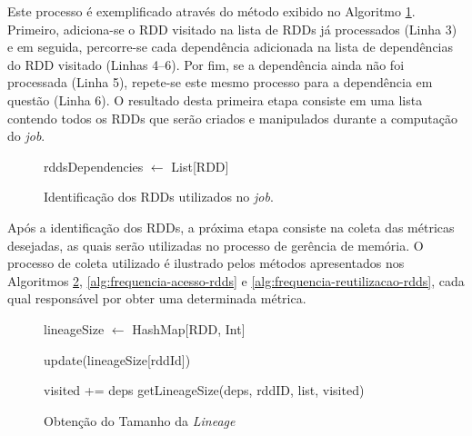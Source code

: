 Este processo é exemplificado através do método exibido no Algoritmo \ref{alg:lista-rdds}. Primeiro, adiciona-se o RDD visitado na lista de RDDs já processados (Linha 3) e em seguida, percorre-se cada dependência adicionada na lista de dependências do RDD visitado (Linhas 4--6). Por fim, se a dependência ainda não foi processada (Linha 5), repete-se este mesmo processo para a dependência em questão (Linha 6). O resultado desta primeira etapa consiste em uma lista contendo todos os RDDs que serão criados e manipulados durante a computação do \textit{job}. 

\begin{figure}[!ht]
    \begin{algorithm}[H]
        \caption{Identificação dos RDDs utilizados no \textit{job}.}
        \label{alg:lista-rdds}
        rddsDependencies $\leftarrow$ List[RDD]\;
        
    \end{algorithm}
\end{figure}

Após a identificação dos RDDs, a próxima etapa consiste na coleta das métricas desejadas, as quais serão utilizadas no processo de gerência de memória. O processo de coleta utilizado é ilustrado pelos métodos apresentados nos Algoritmos \ref{alg:tamanho-lineage-rdds}, \ref{alg:frequencia-acesso-rdds} e \ref{alg:frequencia-reutilizacao-rdds}, cada qual responsável por obter uma determinada métrica.

\begin{figure}[!ht]
    \begin{algorithm}[H]
        \caption{Obtenção do Tamanho da \textit{Lineage}}
        \label{alg:tamanho-lineage-rdds}
        lineageSize $\leftarrow$ HashMap[RDD, Int]\;
        
         {
           update(lineageSize[rddId])\; 
           
            {
                 {
                    visited += deps\;
                    getLineageSize(deps, rddID, list, visited)\;
                }
           }
        }
    \end{algorithm}
\end{figure}

